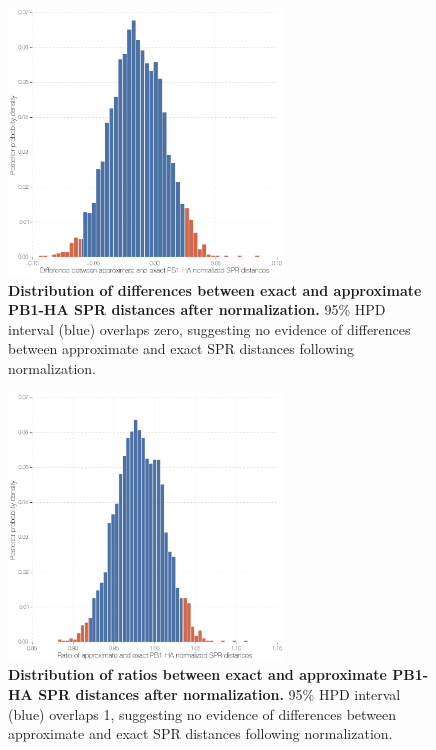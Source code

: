 \documentclass[11pt,oneside,letterpaper]{article}
\begin{document}
\begin{figure}
\centering  
\includegraphics[width=0.65\textwidth]  {supp_figures/InfB_supp_NormPB1-HA_hist.png}
\caption{\textbf{Distribution of differences between exact and approximate PB1-HA SPR distances after normalization.}
95\% HPD interval (blue) overlaps zero, suggesting no evidence of differences between approximate and exact SPR distances following normalization.}
\label{NormSPR_PB1-HA_difference}
\end{figure}

\begin{figure}
\centering  
\includegraphics[width=0.65\textwidth]  {supp_figures/InfB_supp_NormPB1-HA_hist2.png}
\caption{\textbf{Distribution of ratios between exact and approximate PB1-HA SPR distances after normalization.}
95\% HPD interval (blue) overlaps 1, suggesting no evidence of differences between approximate and exact SPR distances following normalization.}
\label{NormSPR_PB1-HA_ratio}
\end{figure}
\end{document}
